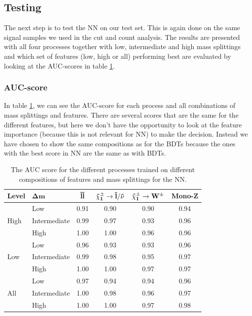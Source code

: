 \subsection{Testing}
The next step is to test the NN on our test set. This is again done on the same signal samples we used in the cut and count analysis. The results are presented with all four processes together with low, intermediate and high mass splittings and which set of features (low, high or all) performing best are evaluated by looking at the AUC-scores in table \ref{tab:AUCNN}.


\subsubsection{AUC-score}
In table \ref{tab:AUCNN}, we can see the AUC-score for each process and all combinations of mass splittings and features. There are several scores that are the same for the different features, but here we don't have the opportunity to look at the feature importance (because this is not relevant for NN) to make the decision. Instead we have chosen to show the same compositions as for the BDTs because the ones with the best score in NN are the same as with BDTs. 

\begin{table}[H]
    \centering
    \renewcommand{\arraystretch}{1.}
    \begin{tabular}{l l c c c c }
    \toprule
    \textbf{Level} & $\mathbf{\Delta m}$ & $\mathbf{\Tilde{l} \Tilde{l}}$ & $\mathbf{\Tilde{\chi}_1^\pm \rightarrow \Tilde{l}/\Tilde{\nu}}$ & $\mathbf{\Tilde{\chi}_1^\pm \rightarrow W^\pm}$ & \textbf{Mono-Z}  \\
    \midrule
    \midrule
    \multirow{3}{*}{High} &  Low   & 0.91 & 0.90 & 0.90 & 0.94 \\
     & Intermediate & 0.99 & 0.97 & 0.93 & 0.96 \\
     & High & 1.00 & 1.00 & 0.96 & 0.96 \\
     \midrule
    \multirow{3}{*}{Low} & Low & 0.96 & 0.93 & 0.93 & 0.96 \\
     & Intermediate & 0.99 & 0.98 & 0.95 & 0.97 \\
     & High & 1.00 & 1.00 & 0.97 & 0.97 \\
     \midrule
    \multirow{3}{*}{All} & Low & 0.97 & 0.94 & 0.94 & 0.96 \\
     & Intermediate & 1.00 & 0.98 & 0.96 & 0.97 \\
     & High & 1.00 & 1.00 & 0.97 & 0.98 \\
     \bottomrule
    \end{tabular}
    \caption{The AUC score for the different processes trained on different compositions of features and mass splittings for the NN.}
    \label{tab:AUCNN}
\end{table}







